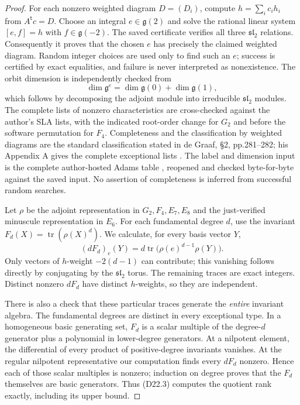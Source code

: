 \begin{proof}
For each nonzero weighted diagram $D=(D_i)$, compute
$h=\sum_i c_i h_i$ from $A^{\mathsf t}c=D$.
Choose an integral $e\in\mathfrak g(2)$ and solve the rational
linear system $[e,f]=h$ with $f\in\mathfrak g(-2)$.
The saved certificate verifies all three $\mathfrak{sl}_2$ relations.
Consequently it proves that the chosen $e$ has precisely the claimed
weighted diagram.  Random integer choices are used only to find
such an $e$; success is certified by exact equalities, and failure
is never interpreted as nonexistence.  The orbit dimension is
independently checked from
\[
 \dim\mathfrak g^e=\dim\mathfrak g(0)+\dim\mathfrak g(1),
\]
which follows by decomposing the adjoint module into irreducible
$\mathfrak{sl}_2$ modules.
The complete lists of nonzero characteristics are cross-checked
against the author's SLA lists, with the indicated root-order
change for $G_2$ and before the software permutation for $F_4$.
Completeness and the classification by weighted diagrams are the
standard classification stated in de Graaf, \S2, pp.281--282;
his Appendix A gives the complete exceptional lists
\cite{D-deGraaf}. The label and dimension input is the complete
author-hosted Adams table \cite{D-AdamsOrbitTables}, reopened and
checked byte-for-byte against the saved input. No assertion of completeness is inferred from
successful random searches.

Let $\rho$ be the adjoint representation in $G_2,F_4,E_7,E_8$
and the just-verified minuscule representation in $E_6$.
For each fundamental degree $d$, use the invariant
$F_d(X)=\operatorname{tr}(\rho(X)^d)$.  We calculate, for every
basis vector $Y$,
\[
 (dF_d)_e(Y)=d\operatorname{tr}
                 \bigl(\rho(e)^{d-1}\rho(Y)\bigr).       \tag{D22.3}
\]
Only vectors of $h$-weight $-2(d-1)$ can contribute; this vanishing
follows directly by conjugating by the $\mathfrak{sl}_2$ torus.
The remaining traces are exact integers.  Distinct nonzero
$dF_d$ have distinct $h$-weights, so they are independent.

There is also a check that these particular traces generate the
\emph{entire} invariant algebra.  The fundamental degrees are distinct
in every exceptional type.  In a homogeneous basic generating set,
$F_d$ is a scalar multiple of the degree-$d$ generator plus a
polynomial in lower-degree generators.  At a nilpotent element,
the differential of every product of positive-degree invariants
vanishes.  At the regular nilpotent representative our computation
finds every $dF_d$ nonzero.  Hence each of those scalar multiples
is nonzero; induction on degree proves that the $F_d$ themselves
are basic generators.  Thus (D22.3) computes the quotient rank
exactly, including its upper bound.


\end{proof}
